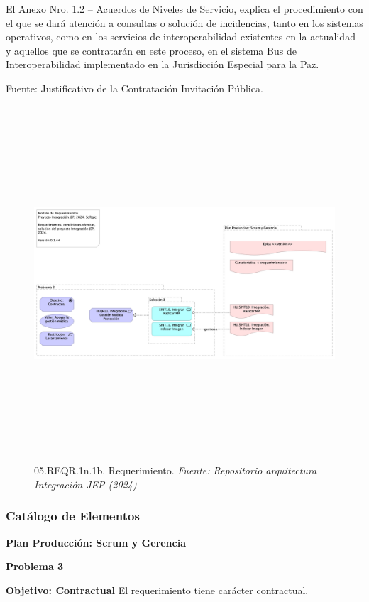 \documentclass[
  paper=a4,
  ,captions=tableheading
]{scrartcl}
\begin{document}
El Anexo Nro. 1.2 -- Acuerdos de Niveles de Servicio, explica el
procedimiento con el que se dará atención a consultas o solución de
incidencias, tanto en los sistemas operativos, como en los servicios de
interoperabilidad existentes en la actualidad y aquellos que se
contratarán en este proceso, en el sistema Bus de Interoperabilidad
implementado en la Jurisdicción Especial para la Paz.

Fuente: Justificativo de la Contratación Invitación Pública.

\begin{figure}
\centering
\includegraphics[width=\textwidth,height=5.20833in]{images/05.REQR.1n.1b.Requerimiento.png}
\caption{05.REQR.1n.1b. Requerimiento. \emph{Fuente: Repositorio
arquitectura Integración JEP
(2024)}}\label{fig:id-8b4c8be23da34d399e8127a08a5204b8}
\end{figure}

\subsubsection{Catálogo de
Elementos}\label{sec:catuxe1logo-de-elementos-6}

\textbf{Plan Producción: Scrum y Gerencia}

\textbf{Problema 3}

\textbf{Objetivo: Contractual} El requerimiento tiene carácter
contractual.
\end{document}
